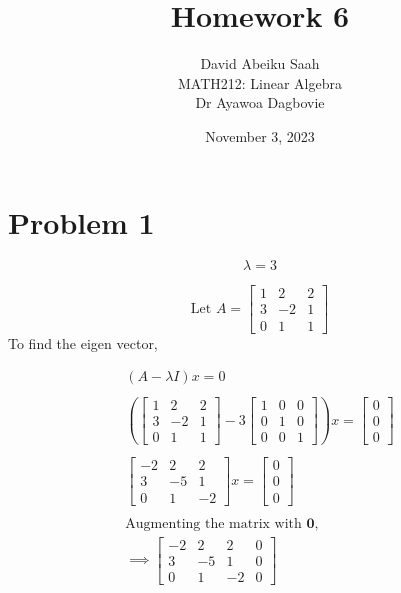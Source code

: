 \documentclass[12pt, a4paper]{article}
\title{
    \textbf{Homework 6} \\ \vspace{1cm}
}
\author{
\vspace*{0.5cm}
    David Abeiku Saah \\ \vspace{0.4cm}
    MATH212: Linear Algebra \\ \vspace{0.5cm}
    Dr Ayawoa Dagbovie \\
}
\date{November 3, 2023}
\begin{document}
\maketitle

\newpage

\section*{Problem 1}

\[
    \lambda = 3
\]

\[
    \text{Let } A = \begin{bmatrix}
        1 & 2 & 2 \\
        3 & -2 & 1 \\
        0 & 1 & 1
    \end{bmatrix}
\]
To find the eigen vector,

\begin{align*}
    (A - \lambda I)x = 0 \\ \\
    \left(\begin{bmatrix}
        1 & 2 & 2 \\
        3 & -2 & 1 \\
        0 & 1 & 1
    \end{bmatrix} - 3 \begin{bmatrix}
        1 & 0 & 0 \\
        0 & 1 & 0 \\
        0 & 0 & 1
    \end{bmatrix}\right)x = \begin{bmatrix}
        0 \\
        0 \\
        0
    \end{bmatrix} \\ \\
    \begin{bmatrix}
        -2 & 2 & 2 \\
        3 & -5 & 1 \\
        0 & 1 & -2
    \end{bmatrix}x = \begin{bmatrix}
        0 \\
        0 \\
        0
    \end{bmatrix} \\ \\
    \text{Augmenting the matrix with } \boldsymbol{0}, \\
    \implies \begin{bmatrix}
        -2 & 2 & 2 & 0 \\
        3 & -5 & 1 & 0 \\
        0 & 1 & -2 & 0
    \end{bmatrix}
\end{align*}
\end{document}
